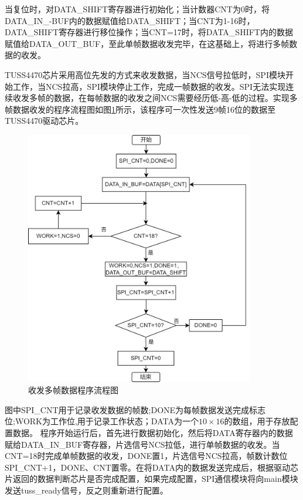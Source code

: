 当复位时，对DATA\_SHIFT寄存器进行初始化；当计数器CNT为0时，将DATA\_IN\_-BUF内的数据赋值给DATA\_SHIFT；当CNT为1-16时，DATA\_SHIFT寄存器进行移位操作；当CNT=17时，将DATA\_SHIFT内的数据赋值给DATA\_OUT\_BUF，至此单帧数据收发完毕，在这基础上，将进行多帧数据的收发。




TUSS4470芯片采用高位先发的方式来收发数据，当NCS信号拉低时，SPI模块开始工作，当NCS拉高，SPI模块停止工作，完成一帧数据的收发。SPI无法实现连续收发多帧的数据，在每帧数据的收发之间NCS需要经历低-高-低的过程。实现多帧数据收发的程序流程图如图\ref{收发多帧数据程序流程图}所示，该程序可一次性发送9帧16位的数据至TUSS4470驱动芯片。
\begin{figure}[ht]
	\centering
	\includegraphics[width=10cm]{figure/SPI Program Flow Chart.png}
	\caption{收发多帧数据程序流程图}
	\label{收发多帧数据程序流程图}
\end{figure} 
图中SPI\_CNT用于记录收发数据的帧数;DONE为每帧数据发送完成标志位;WORK为工作位,用于记录工作状态；DATA为一个$10\times16$的数组，用于存放配置数据。
程序开始运行后，首先进行数据初始化，然后将DATA寄存器内的数据赋给DATA\_IN\_BUF寄存器，片选信号NCS拉低，进行单帧数据的收发。当CNT=18时完成单帧数据的收发，DONE置1，片选信号NCS拉高，帧数计数位SPI\_CNT+1，DONE、CNT置零。在将DATA内的数据发送完成后，根据驱动芯片返回的数据判断芯片是否完成配置，如果完成配置，SPI通信模块将向main模块发送tuss\_ready信号，反之则重新进行配置。





\noindent
